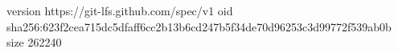 version https://git-lfs.github.com/spec/v1
oid sha256:623f2cea715dc5dfaff6cc2b13b6cd247b5f34de70d96253c3d99772f539ab0b
size 262240
